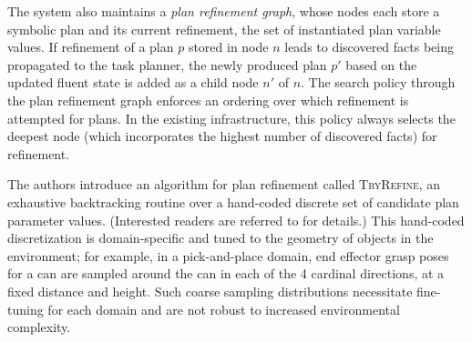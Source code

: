 The system also maintains a \emph{plan refinement graph}, whose nodes each store a symbolic plan and
its current refinement, the set of instantiated plan variable values. If refinement of a plan $p$ stored in node
$n$ leads to discovered facts being propagated to the task planner, the newly produced plan $p'$ based on
the updated fluent state is added as a child node $n'$ of $n$. The search policy through the plan refinement graph
enforces an ordering over which refinement is attempted for plans. In the existing infrastructure, this policy
always selects the deepest node (which incorporates the highest number of discovered facts) for refinement.

The authors introduce an algorithm for plan refinement
called \textsc{TryRefine}, an exhaustive backtracking routine over a hand-coded discrete set of candidate
plan parameter values. (Interested readers are referred to \cite{srivastava2014combined} for details.)
This hand-coded discretization is domain-specific and tuned to the geometry of objects in the
environment; for example, in a pick-and-place domain, end effector grasp poses for a can are
sampled around the can in each of the 4 cardinal directions, at a fixed distance and height.
Such coarse sampling distributions necessitate fine-tuning for each domain and are not robust to
increased environmental complexity.

